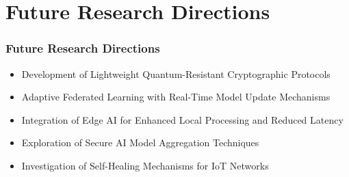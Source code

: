 \documentclass [xcolor=svgnames] {beamer}
\begin{document}
\section{Future Research Directions}
\begin{frame}
\large
\frametitle{Future Research Directions}

\begin{itemize}
\item Development of Lightweight Quantum-Resistant Cryptographic Protocols
\item Adaptive Federated Learning with Real-Time Model Update Mechanisms
\item Integration of Edge AI for Enhanced Local Processing and Reduced Latency
\item Exploration of Secure AI Model Aggregation Techniques
\item Investigation of Self-Healing Mechanisms for IoT Networks
\end{itemize}

\end{frame}
\end{document}
